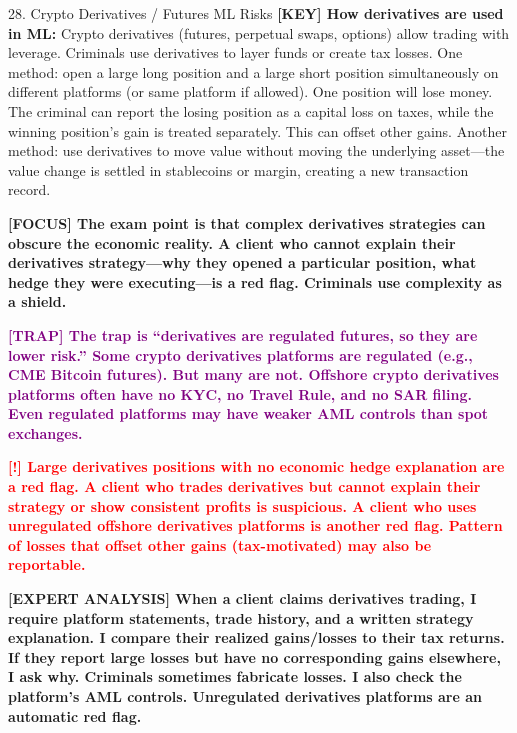 \documentclass[11pt,a4paper]{beamer}
\newcommand{\redflag}[1]{\textcolor{red}{\textbf{[!] #1}}}
\newcommand{\examfocus}[1]{\textcolor{orange!80!black}{\textbf{[FOCUS] #1}}}
\newcommand{\trap}[1]{\textcolor{purple}{\textbf{[TRAP] #1}}}
\newcommand{\keyterm}[1]{\textcolor{red!80!black}{\textbf{[KEY] #1}}}
\newcommand{\expert}[1]{\textcolor{blue!70!black}{\textbf{[EXPERT ANALYSIS] #1}}}
\begin{document}
	\begin{frame}{28. Crypto Derivatives / Futures ML Risks}
		\tiny
		\keyterm{How derivatives are used in ML:} Crypto derivatives (futures, perpetual swaps, options) allow trading with leverage. Criminals use derivatives to layer funds or create tax losses. One method: open a large long position and a large short position simultaneously on different platforms (or same platform if allowed). One position will lose money. The criminal can report the losing position as a capital loss on taxes, while the winning position's gain is treated separately. This can offset other gains. Another method: use derivatives to move value without moving the underlying asset—the value change is settled in stablecoins or margin, creating a new transaction record.
		
		\vspace{0.1cm}
		\examfocus{The exam point is that complex derivatives strategies can obscure the economic reality. A client who cannot explain their derivatives strategy—why they opened a particular position, what hedge they were executing—is a red flag. Criminals use complexity as a shield.}
		
		\vspace{0.1cm}
		\trap{The trap is “derivatives are regulated futures, so they are lower risk.” Some crypto derivatives platforms are regulated (e.g., CME Bitcoin futures). But many are not. Offshore crypto derivatives platforms often have no KYC, no Travel Rule, and no SAR filing. Even regulated platforms may have weaker AML controls than spot exchanges.}
		
		\vspace{0.1cm}
		\redflag{Large derivatives positions with no economic hedge explanation are a red flag. A client who trades derivatives but cannot explain their strategy or show consistent profits is suspicious. A client who uses unregulated offshore derivatives platforms is another red flag. Pattern of losses that offset other gains (tax-motivated) may also be reportable.}
		
		\vspace{0.1cm}
		\expert{When a client claims derivatives trading, I require platform statements, trade history, and a written strategy explanation. I compare their realized gains/losses to their tax returns. If they report large losses but have no corresponding gains elsewhere, I ask why. Criminals sometimes fabricate losses. I also check the platform's AML controls. Unregulated derivatives platforms are an automatic red flag.}
	\end{frame}
	
\end{document}
